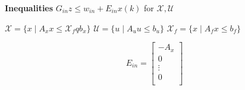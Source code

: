 \textbf{Inequalities}
$G_{in}z \leq w_{in} + E_{in}x(k)$
for $\mathcal{X},\mathcal{U}$

\begin{minipage}[c]{0.5\linewidth}
	$\mathcal{X} = \{x \mid A_x x \le \mathcal{X}_fq b_x\}$
	$\mathcal{U}   = \{u \mid A_u u \leq b_u\}$
	$\mathcal{X}_f = \{x \mid A_f x \leq b_f\}$
\end{minipage}
\begin{minipage}[b]{0.4\linewidth}
	\[E_{in} =
		\left[
			\begin{smallmatrix}
				-A_x \\
				0 \\
				\vdots \\
				0 \\
			\end{smallmatrix}
			\right]\]
\end{minipage}
